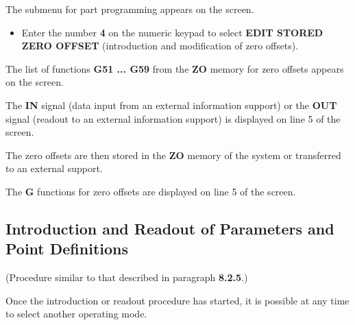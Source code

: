 The submenu for part programming appears on the screen.

\begin{itemize}
    \item Enter the number \textbf{4} on the numeric keypad to select \textbf{EDIT STORED ZERO OFFSET} (introduction and modification of zero offsets).
\end{itemize}

The list of functions \textbf{G51 ... G59} from the \textbf{ZO} memory for zero offsets appears on the screen.

\begin{itemize}
\end{itemize}

\vspace{.5cm}

\begin{itemize}
\end{itemize}

The \textbf{IN} signal (data input from an external information support) or the \textbf{OUT} signal (readout to an external information support) is displayed on line 5 of the screen.

The zero offsets are then stored in the \textbf{ZO} memory of the system or transferred to an external support.

The \textbf{G} functions for zero offsets are displayed on line 5 of the screen.

\subsection{Introduction and Readout of Parameters and Point Definitions}

(Procedure similar to that described in paragraph \textbf{8.2.5}.)

\notes

Once the introduction or readout procedure has started, it is possible at any time to select another operating mode.